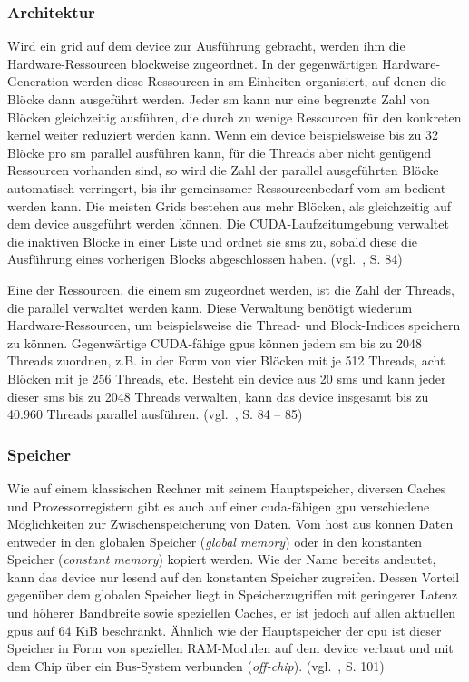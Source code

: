 \subsubsection*{Architektur}

Wird ein \gls{grid} auf dem \gls{device} zur Ausführung gebracht, werden ihm die Hardware-Ressourcen blockweise
zugeordnet. In der gegenwärtigen Hardware-Generation werden diese Ressourcen in \gls{sm}-Einheiten organisiert, auf
denen die Blöcke dann ausgeführt werden. Jeder \gls{sm} kann nur eine begrenzte Zahl von Blöcken gleichzeitig ausführen,
die durch zu wenige Ressourcen für den konkreten \gls{kernel} weiter reduziert werden kann. Wenn ein \gls{device}
beispielsweise bis zu 32 Blöcke pro \gls{sm} parallel ausführen kann, für die Threads aber nicht genügend Ressourcen
vorhanden sind, so wird die Zahl der parallel ausgeführten Blöcke automatisch verringert, bis ihr gemeinsamer
Ressourcenbedarf vom \gls{sm} bedient werden kann. Die meisten Grids bestehen aus mehr Blöcken, als gleichzeitig auf dem
\gls{device} ausgeführt werden können. Die CUDA-Laufzeitumgebung verwaltet die inaktiven Blöcke in einer Liste und
ordnet sie \gls{sm}s zu, sobald diese die Ausführung eines vorherigen Blocks abgeschlossen haben. (vgl.~\cite{kirkhwu},
S. 84)

Eine der Ressourcen, die einem \gls{sm} zugeordnet werden, ist die Zahl der Threads, die parallel verwaltet
werden kann. Diese Verwaltung benötigt wiederum Hardware-Ressourcen, um beispielsweise die Thread- und Block-Indices
speichern zu können. Gegenwärtige CUDA-fähige \gls{gpu}s können jedem \gls{sm} bis zu 2048 Threads zuordnen, z.B. in der
Form von vier Blöcken mit je 512 Threads, acht Blöcken mit je 256 Threads, etc. Besteht ein \gls{device} aus 20
\gls{sm}s und kann jeder dieser \gls{sm}s bis zu 2048 Threads verwalten, kann das \gls{device} insgesamt bis zu 40.960
Threads parallel ausführen. (vgl.~\cite{kirkhwu}, S. 84 -- 85)

\subsubsection*{Speicher}

Wie auf einem klassischen Rechner mit seinem Hauptspeicher, diversen Caches und Prozessorregistern gibt es auch auf
einer \gls{cuda}-fähigen \gls{gpu} verschiedene Möglichkeiten zur Zwischenspeicherung von Daten. Vom \gls{host} aus
können Daten entweder in den globalen Speicher (\textit{global memory}) oder in den konstanten Speicher
(\textit{constant memory}) kopiert werden. Wie der Name bereits andeutet, kann das \gls{device} nur lesend auf den
konstanten Speicher zugreifen. Dessen Vorteil gegenüber dem globalen Speicher liegt in Speicherzugriffen mit geringerer
Latenz und höherer Bandbreite sowie speziellen Caches, er ist jedoch auf allen aktuellen \gls{gpu}s auf 64 KiB
beschränkt. Ähnlich wie der Hauptspeicher der \gls{cpu} ist dieser Speicher in Form von speziellen RAM-Modulen auf dem
\gls{device} verbaut und mit dem Chip über ein Bus-System verbunden (\textit{off-chip}). (vgl.~\cite{kirkhwu}, S. 101)

